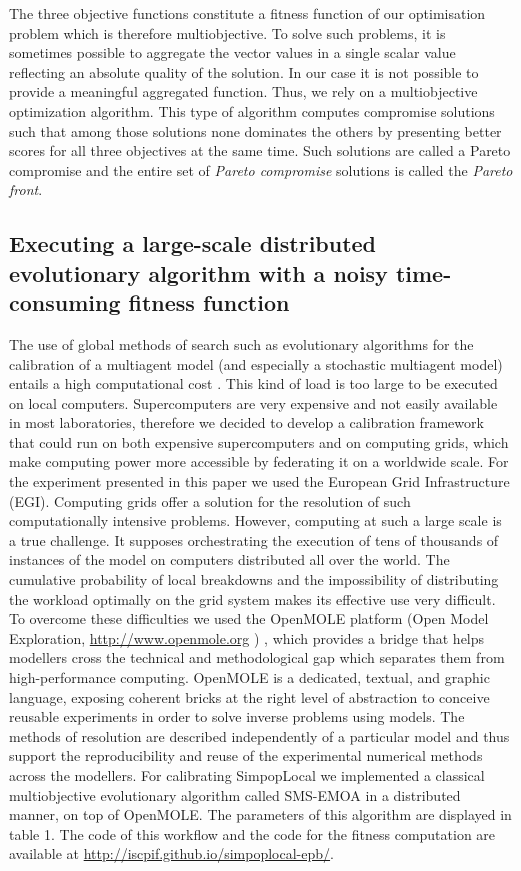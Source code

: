 The three objective functions constitute a fitness function of our optimisation problem which is therefore multiobjective. To solve such problems, it is sometimes possible to aggregate the vector values in a single scalar value reflecting an absolute quality of the solution. In our case it is not possible to provide a meaningful aggregated function. Thus, we rely on a multiobjective optimization algorithm. This type of algorithm computes compromise solutions such that among those solutions none dominates the others by presenting better scores for all three objectives at the same time. Such solutions are called a Pareto compromise and the entire set of \textit{Pareto compromise} solutions is called the \textit{Pareto front}.


\subsection{Executing a large-scale distributed evolutionary algorithm with a noisy time-consuming fitness function}
\label{subsec:executing}

The use of global methods of search such as evolutionary algorithms for the calibration of a multiagent model (and especially a stochastic multiagent model) entails a high computational cost \autocite{Sharma2006}. This kind of load is too large to be executed on local computers. Supercomputers are very expensive and not easily available in most laboratories, therefore we decided to develop a calibration framework that could run on both expensive supercomputers and on computing grids, which make computing power more accessible by federating it on a worldwide scale. For the experiment presented in this paper we used the European Grid Infrastructure (EGI). Computing grids offer a solution for the resolution of such computationally intensive problems. However, computing at such a large scale is a true challenge. It supposes orchestrating the execution of tens of thousands of instances of the model on computers distributed all over the world. The cumulative probability of local breakdowns and the impossibility of distributing the workload optimally on the grid system makes its effective use very difficult. To overcome these difficulties we used the OpenMOLE platform (Open Model Exploration, \href{http://www.openmole.org}{http://www.openmole.org} ) \autocites{Reuillon2010,Reuillon2013}, which provides a bridge that helps modellers cross the technical and methodological gap which separates them from high-performance computing. OpenMOLE is a dedicated, textual, and graphic language, exposing coherent bricks at the right level of abstraction to conceive reusable experiments in order to solve inverse problems using models. The methods of resolution are described independently of a particular model and thus support the reproducibility and reuse of the experimental numerical methods across the modellers. For calibrating SimpopLocal we implemented a classical multiobjective evolutionary algorithm called SMS-EMOA \autocite{Emmerich2005} in a distributed manner, on top of OpenMOLE. The parameters of this algorithm are displayed in table 1. The code of this workflow and the code for the fitness computation are available at \href{http://iscpif.github.io/simpoplocal-epb/}{http://iscpif.github.io/simpoplocal-epb/}.


